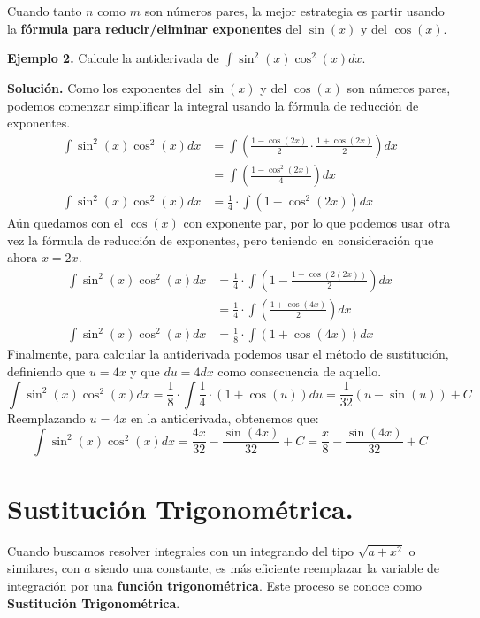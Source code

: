 \documentclass[12pt]{article}
\begin{document}
Cuando tanto $n$ como $m$ son números pares, la mejor estrategia es partir usando la \textbf{fórmula para reducir/eliminar exponentes} del $\sin(x)$ y del $\cos(x)$.

\textbf{Ejemplo 2.} Calcule la antiderivada de $\int \sin^{2}(x)\cos^{2}(x) dx$.

\textbf{Solución.} Como los exponentes del $\sin(x)$ y del $\cos(x)$ son números pares, podemos comenzar simplificar la integral usando la fórmula de reducción de exponentes.
\begin{align*}
  \int \sin^{2}(x)\cos^{2}(x) dx &= \int \left(\frac{1 - \cos(2x)}{2} \cdot \frac{1 + \cos(2x)}{2}\right) dx \\
                                 &= \int \left(\frac{1 - \cos^{2}(2x)}{4}\right) dx \\
  \int \sin^{2}(x)\cos^{2}(x) dx &= \frac{1}{4} \cdot \int (1 - \cos^{2}(2x)) dx
\end{align*}
Aún quedamos con el $\cos(x)$ con exponente par, por lo que podemos usar otra vez la fórmula de reducción de exponentes, pero teniendo en consideración que ahora $x = 2x$.
\begin{align*}
  \int \sin^{2}(x)\cos^{2}(x) dx &= \frac{1}{4} \cdot \int \left(1 - \frac{1 + \cos(2(2x))}{2}\right) dx \\
                                 &= \frac{1}{4} \cdot \int \left(\frac{1 + \cos(4x)}{2}\right) dx \\
  \int \sin^{2}(x)\cos^{2}(x) dx &= \frac{1}{8} \cdot \int (1 + \cos(4x)) dx
\end{align*}
Finalmente, para calcular la antiderivada podemos usar el método de sustitución, definiendo que $u = 4x$ y que $du = 4dx$ como consecuencia de aquello.
\[
\int \sin^{2}(x)\cos^{2}(x) dx = \frac{1}{8} \cdot \int \frac{1}{4} \cdot (1 + \cos(u)) du
                               = \frac{1}{32} (u - \sin(u)) + C
\]
Reemplazando $u = 4x$ en la antiderivada, obtenemos que:
\[
  \int \sin^{2}(x)\cos^{2}(x) dx = \frac{4x}{32} - \frac{\sin(4x)}{32} + C = \frac{x}{8} - \frac{\sin(4x)}{32} + C
\]

\section{Sustitución Trigonométrica.}

Cuando buscamos resolver integrales con un integrando del tipo $\sqrt{a + x^{2}}$ o similares, con $a$ siendo una constante, es más eficiente reemplazar la variable de integración por una \textbf{función trigonométrica}. Este proceso se conoce como \textbf{Sustitución Trigonométrica}.
\end{document}
